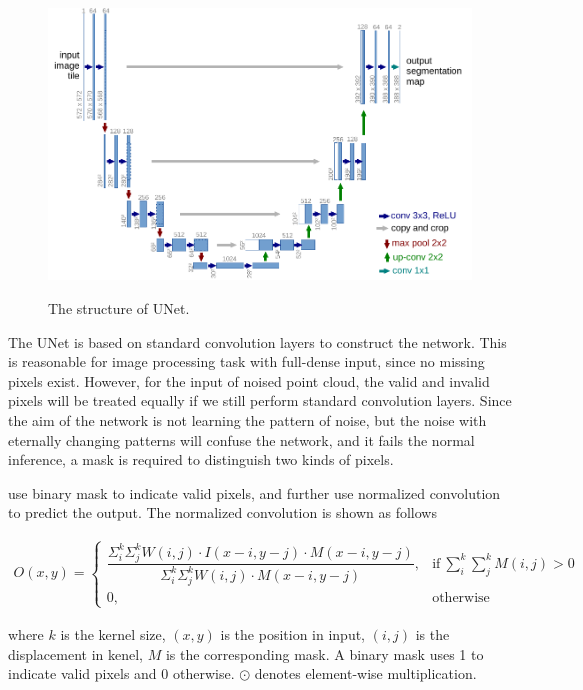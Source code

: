 \begin{figure}[th]
	\centering
	\includegraphics[width=.8\textwidth]{./Figures/u-net-illustration-correct-scale2.pdf}
	\label{fig:u-net}
	\caption{The structure of UNet. \cite{unet}}
\end{figure}


The UNet is based on standard convolution layers to construct the network. This is reasonable for image processing task with full-dense input, since no missing pixels exist. 
However, for the input of noised point cloud, the valid and invalid pixels will be treated equally if we still perform standard convolution layers. Since the aim of the network is not learning the pattern of noise, but the noise with eternally changing patterns will confuse the network, and it fails the normal inference, a mask is required to distinguish two kinds of pixels. 

\cite{pncnn0} use binary mask to indicate valid pixels, and further use normalized convolution to predict the output. The normalized convolution is shown as follows

\begin{equation}
	\begin{array}{rrclcl}
		O(x,y) = 
		\begin{cases}
			\dfrac{\Sigma_i^k\Sigma_j^k W(i,j) \cdot I(x-i,y-j) \cdot M(x-i,y-j)}{\Sigma_i^k\Sigma_j^k W(i,j) \cdot M(x-i,y-j)}, & \text{if}\ \sum_{i}^k\sum_{j}^k M(i,j)>0 \\
			0, & \text{otherwise}
		\end{cases}
	\end{array}
\end{equation}

where $ k $ is the kernel size, $ (x,y) $ is the position in input, $ (i,j) $ is the displacement in kenel, $ M $ is the corresponding mask. A binary mask uses 1 to indicate valid pixels and 0 otherwise. $ \odot $ denotes element-wise multiplication.

